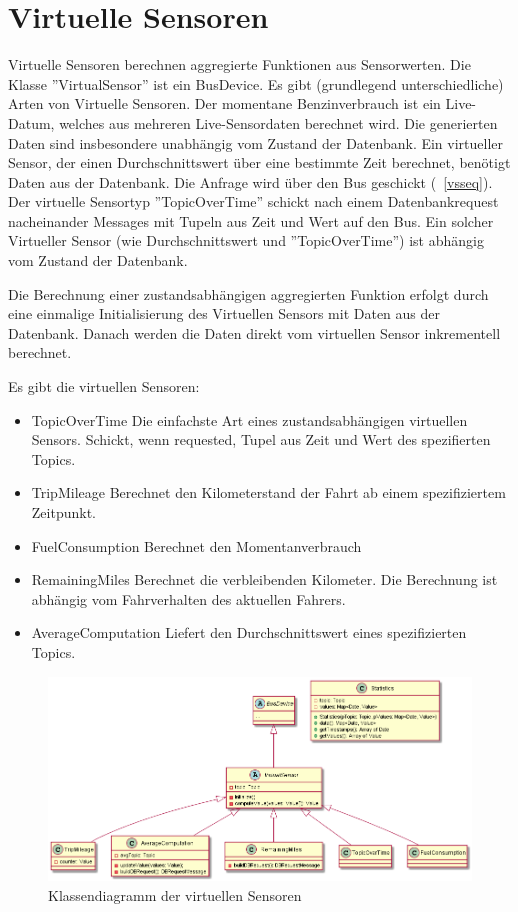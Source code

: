 \documentclass[entwurf.tex]{subfiles}
\begin{document}
  	\newpage
  	\section{Virtuelle Sensoren}
		Virtuelle Sensoren berechnen aggregierte Funktionen aus Sensorwerten. Die Klasse ''VirtualSensor'' ist ein BusDevice. Es gibt (grundlegend unterschiedliche) Arten von Virtuelle Sensoren. Der momentane Benzinverbrauch ist ein Live-Datum, welches aus mehreren Live-Sensordaten berechnet wird. Die generierten Daten sind insbesondere unabhängig vom Zustand der Datenbank. Ein virtueller Sensor, der einen Durchschnittswert über eine bestimmte Zeit berechnet, benötigt Daten aus der Datenbank. Die Anfrage wird über den Bus geschickt (~\ref{vsseq}). Der virtuelle Sensortyp ''TopicOverTime'' schickt nach einem Datenbankrequest nacheinander Messages mit Tupeln aus Zeit und Wert auf den Bus. Ein solcher Virtueller Sensor (wie Durchschnittswert und ''TopicOverTime'') ist abhängig vom Zustand der Datenbank.

		Die Berechnung einer zustandsabhängigen aggregierten Funktion erfolgt durch eine einmalige Initialisierung des Virtuellen Sensors mit Daten aus der Datenbank. Danach werden die Daten direkt vom virtuellen Sensor inkrementell berechnet.

		Es gibt die virtuellen Sensoren:
		\begin{itemize}
			\item{TopicOverTime} Die einfachste Art eines zustandsabhängigen virtuellen Sensors. Schickt, wenn requested, Tupel aus Zeit und Wert des spezifierten Topics.
			\item{TripMileage} Berechnet den Kilometerstand der Fahrt ab einem spezifiziertem Zeitpunkt.
			\item{FuelConsumption} Berechnet den Momentanverbrauch
			\item{RemainingMiles} Berechnet die verbleibenden Kilometer. Die Berechnung ist abhängig vom Fahrverhalten des aktuellen Fahrers.
			\item{AverageComputation} Liefert den Durchschnittswert eines spezifizierten Topics.
		\end{itemize}

		\begin{figure}[H]
  			\begin{center}
 				\includegraphics[width=0.8\textheight,angle=90]{diagrams/VirtualSensors.png}
  				\caption{Klassendiagramm der virtuellen Sensoren}
  			\end{center}
  		\end{figure}
  	\newpage
\end{document}
